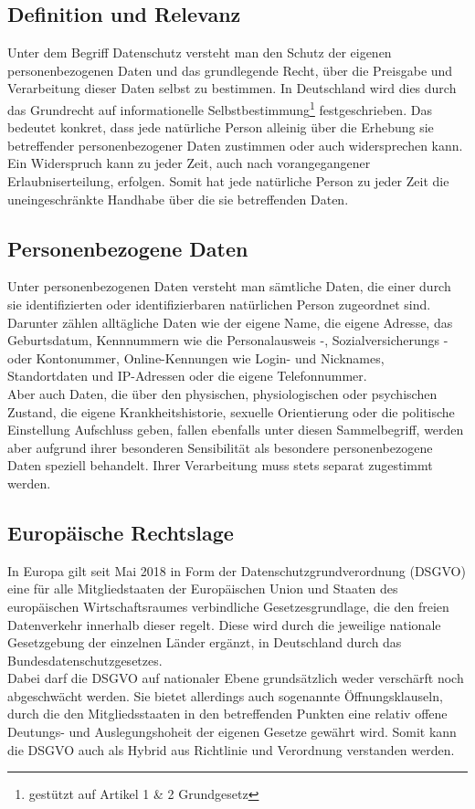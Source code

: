 \subsection{Definition und Relevanz}
    Unter dem Begriff Datenschutz versteht man den Schutz der eigenen personenbezogenen Daten und das grundlegende Recht, über die Preisgabe und Verarbeitung dieser Daten selbst zu bestimmen. In Deutschland wird dies durch das Grundrecht auf informationelle Selbstbestimmung\footnote{gestützt auf Artikel 1 \& 2 Grundgesetz} festgeschrieben. Das bedeutet konkret, dass jede natürliche Person alleinig über die Erhebung sie betreffender personenbezogener Daten zustimmen oder auch widersprechen kann. Ein Widerspruch kann zu jeder Zeit, auch nach vorangegangener Erlaubniserteilung, erfolgen. Somit hat jede natürliche Person zu jeder Zeit die uneingeschränkte Handhabe über die sie betreffenden Daten.

\subsection{Personenbezogene Daten}
    Unter personenbezogenen Daten versteht man sämtliche Daten, die einer durch sie identifizierten oder identifizierbaren natürlichen Person zugeordnet sind. Darunter zählen alltägliche Daten wie der eigene Name, die eigene Adresse, das Geburtsdatum, Kennnummern wie die Personalausweis -, Sozialversicherungs - oder Kontonummer, Online-Kennungen wie Login- und Nicknames, Standortdaten und IP-Adressen oder die eigene Telefonnummer.\\
    Aber auch Daten, die über den physischen, physiologischen oder psychischen Zustand, die eigene Krankheitshistorie, sexuelle Orientierung oder die politische Einstellung Aufschluss geben, fallen ebenfalls unter diesen Sammelbegriff, werden aber aufgrund ihrer besonderen Sensibilität als \glqq besondere personenbezogene Daten\grqq{} speziell behandelt. Ihrer Verarbeitung muss stets separat zugestimmt werden.

\subsection{Europäische Rechtslage}
    In Europa gilt seit Mai 2018 in Form der \glqq Datenschutzgrundverordnung\grqq{} (DSGVO) eine für alle Mitgliedstaaten der Europäischen Union und Staaten des europäischen Wirtschaftsraumes verbindliche Gesetzesgrundlage, die den freien Datenverkehr innerhalb dieser regelt. Diese wird durch die jeweilige nationale Gesetzgebung der einzelnen Länder ergänzt, in Deutschland durch das Bundesdatenschutzgesetzes.\\
    Dabei darf die DSGVO auf nationaler Ebene grundsätzlich weder verschärft noch abgeschwächt werden. Sie bietet allerdings auch sogenannte Öffnungsklauseln, durch die den Mitgliedsstaaten in den betreffenden Punkten eine relativ offene Deutungs- und Auslegungshoheit der eigenen Gesetze gewährt wird. Somit kann die DSGVO auch als Hybrid aus Richtlinie und Verordnung verstanden werden.\\

